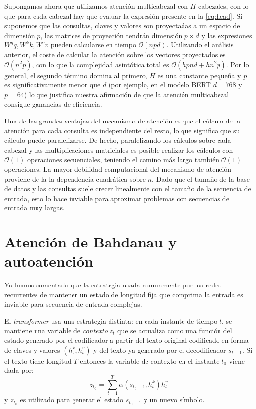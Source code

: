Supongamos ahora que utilizamos atención multicabezal con \( H \) cabezales, con lo que para cada cabezal hay que evaluar la expresión presente en la \cref{eq:head}. Si suponemos que las consultas, claves y valores son proyectadas a un espacio de dimensión \( p \), las matrices de proyección tendrán dimensión \( p \times d \) y las expresiones \( W^q q, W^k k, W^v v \) pueden calcularse en tiempo \( \mathcal{O}(npd) \). Utilizando el análisis anterior, el coste de calcular la atención sobre los vectores proyectados es \( 
\mathcal{O} (n^2 p) \), con lo que la complejidad asintótica total es \( \mathcal{O}(hpnd + hn^2p) \). Por lo general, el segundo término domina al primero, \( H \) es una constante pequeña \cite{voita2019analyzing} y \( p \) es significativamente menor que \( d \) (por ejemplo, en el modelo BERT \( d = 768 \) y \( p = 64 \)) lo que justifica nuestra afirmación de que la atención multicabezal consigue ganancias de eficiencia.

Una de las grandes ventajas del mecanismo de atención es que el cálculo de la atención para cada consulta es independiente del resto, lo que significa que su cálculo puede paralelizarse. De hecho, paralelizando los cálculos sobre cada cabezal y las multiplicaciones matriciales es posible realizar los cálculos con \( \mathcal{O}(1) \) operaciones secuenciales, teniendo el camino más largo también  \( \mathcal{O}(1) \) operaciones. La mayor debilidad computacional del mecanismo de atención proviene de la la dependencia cuadrática sobre \( n \). Dado que el tamaño de la base de datos y las consultas suele crecer linealmente con el tamaño de la secuencia de entrada, esto lo hace inviable para aproximar problemas con secuencias de entrada muy largas.

\section{Atención de Bahdanau y autoatención}
Ya hemos comentado que la estrategia usada comunmente por las redes recurrentes de mantener un estado de longitud fija que comprima la entrada es inviable para secuencia de entrada complejas.

El \textit{transformer} usa una estrategia distinta: en cada instante de tiempo \( t \), se mantiene una variable de \textit{contexto} \( z_t \) que se actualiza como una función del estado generado por el codificador a partir del texto original codificado en forma de claves y valores \( (h_{t}^k, h_{t}^v) \) y del texto ya generado por el decodificador \( s_{t-1} \). Si el texto tiene longitud \( T \) entonces la variable de contexto en el instante \( t_0 \) viene dada por:
\[
    z_{t_0} = \sum^{T}_{t = 1} \alpha(s_{t_0 - 1}, h_{t}^k) h_{t}^v
\]
y \( z_{t_0} \) es utilizado para generar el estado \( s_{t_0 - 1} \) y un nuevo símbolo.

